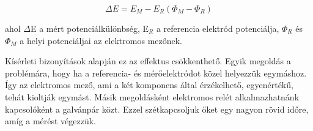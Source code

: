 \begin{equation}
\Delta E = E_M - E_R (\Phi_M - \Phi_R) 
\label{eq:field1}
\end{equation}

ahol $\Delta$E a mért potenciálkülönbség, E$_R$ a referencia elektród potenciálja, $\Phi_R$ és $\Phi_M$ a helyi potenciáljai az elektromos mezőnek. 

Kísérleti bizonyítások alapján ez az effektus csökkenthető. Egyik megoldás a problémára, hogy ha a referencia- és mérőelektródot közel helyezzük egymáshoz. Így az elektromos mező, ami a két komponens által érzékelhető, egyenértékű, tehát kioltják egymást. Másik megoldásként elektromos relét alkalmazhatnánk kapcsolóként a galvánpár közt. Ezzel szétkapcsoljuk őket egy nagyon rövid időre, amíg a mérést végezzük.





